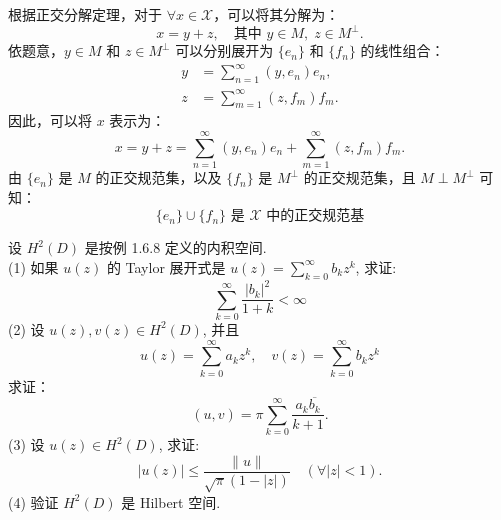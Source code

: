 \documentclass[lang=cn,newtx,10pt,scheme=chinese,thmcnt=chapter]{elegantbook}
\begin{document}
\begin{solution}
根据正交分解定理，对于 $\forall x \in \mathscr{X}$，可以将其分解为：
\[
x = y + z, \quad \text{其中 } y \in M, \; z \in M^{\perp}.
\]
依题意，$y \in M$ 和 $z \in M^{\perp}$ 可以分别展开为 $\{e_n\}$ 和 $\{f_n\}$ 的线性组合：
\[
\begin{aligned}
    y &= \sum_{n=1}^\infty (y, e_n) e_n, \\
    z &= \sum_{m=1}^\infty (z, f_m) f_m.
\end{aligned}
\]
因此，可以将 $x$ 表示为：
\[
x = y + z = \sum_{n=1}^\infty (y, e_n) e_n + \sum_{m=1}^\infty (z, f_m) f_m.
\]
由 $\{e_n\}$ 是 $M$ 的正交规范集，以及 $\{f_n\}$ 是 $M^{\perp}$ 的正交规范集，且 $M \perp M^{\perp}$ 可知：
\[
\{e_n\} \cup \{f_n\} \text{ 是 } \mathscr{X} \text{ 中的正交规范基}
\]
\end{solution}
\begin{problem}
设 $H^2(D)$ 是按例 1.6.8 定义的内积空间.\\
(1) 如果 $u(z)$ 的 Taylor 展开式是 $u(z)=\sum_{k=0}^{\infty} b_k z^k$, 求证:
\begin{equation*}
\sum_{k=0}^{\infty} \frac{\left|b_k\right|^2}{1+k}<\infty
\end{equation*}
(2) 设 $u(z), v(z) \in H^2(D)$, 并且
\begin{equation*}
u(z)=\sum_{k=0}^{\infty} a_k z^k, \quad v(z)=\sum_{k=0}^{\infty} b_k z^k
\end{equation*}
求证：
\begin{equation*}
(u, v)=\pi \sum_{k=0}^{\infty} \frac{a_k \overline{b_k}}{k+1} .
\end{equation*}
(3) 设 $u(z) \in H^2(D)$, 求证:
\begin{equation*}
|u(z)| \leqslant \frac{\|u\|}{\sqrt{\pi}(1-|z|)} \quad(\forall|z|<1) .
\end{equation*}
(4) 验证 $H^2(D)$ 是 Hilbert 空间.
\end{problem}
\end{document}
